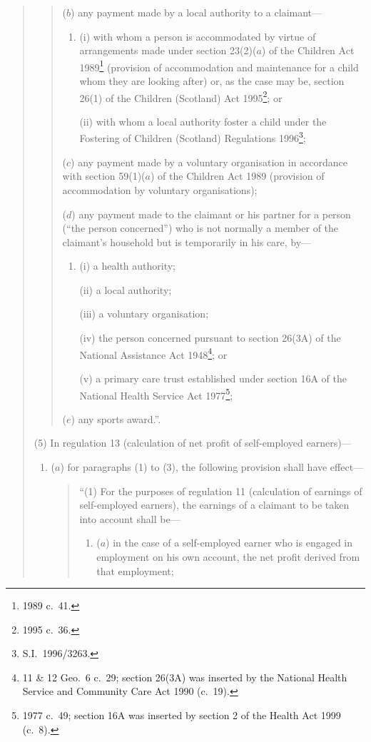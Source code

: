 \documentclass[12pt,a4paper]{article}
\begin{document}
\begin{enumerate}
\begin{quotation}
\begin{enumerate}
\begin{quotation}
\begin{enumerate}
($b$) any payment made by a local authority to a claimant—
\begin{enumerate}\item[]
(i) with whom a person is accommodated by virtue of arrangements made under section 23(2)($a$)  of the Children Act 1989\footnote{1989 c.\ 41.} (provision of accommodation and maintenance for a child whom they are looking after) or, as the case may be, section 26(1) of the Children (Scotland) Act 1995\footnote{1995 c.\ 36.}; or

(ii) with whom a local authority foster a child under the Fostering of Children (Scotland) Regulations 1996\footnote{S.I.\ 1996/3263.};
\end{enumerate}

($c$) any payment made by a voluntary organisation in accordance with section 59(1)($a$)  of the Children Act 1989 (provision of accommodation by voluntary organisations);

($d$) any payment made to the claimant or his partner for a person (“the person concerned”) who is not normally a member of the claimant’s household but is temporarily in his care, by—
\begin{enumerate}\item[]
(i) a health authority;

(ii) a local authority;

(iii) a voluntary organisation;

(iv) the person concerned pursuant to section 26(3A) of the National Assistance Act 1948\footnote{11 \& 12 Geo.\ 6 c.\ 29; section 26(3A) was inserted by the National Health Service and Community Care Act 1990 (c.\ 19).}; or

(v) a primary care trust established under section 16A of the National Health Service Act 1977\footnote{1977 c.\ 49; section 16A was inserted by section 2 of the Health Act 1999 (c.\ 8).};
\end{enumerate}

($e$) any sports award.”.
\end{enumerate}
\end{quotation}
\end{enumerate}

(5) In regulation 13 (calculation of net profit of self-employed earners)—
\begin{enumerate}\item[]
($a$) for paragraphs (1) to (3), the following provision shall have effect—
\begin{quotation}
“(1) For the purposes of regulation 11 (calculation of earnings of self-employed earners), the earnings of a claimant to be taken into account shall be—
\begin{enumerate}\item[]
($a$) in the case of a self-employed earner who is engaged in employment on his own account, the net profit derived from that employment;


\end{enumerate}
\end{quotation}
\end{enumerate}
\end{quotation}
\end{enumerate}
\end{document}
